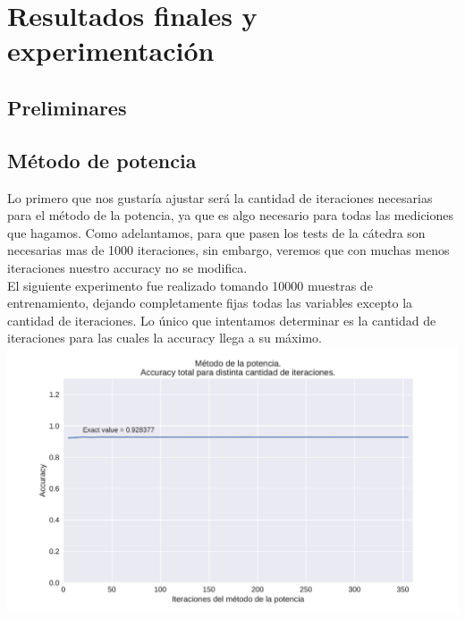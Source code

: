 \section{Resultados finales y experimentación}

\subsection{Preliminares}


\subsection{Método de potencia}

Lo primero que nos gustaría ajustar será la cantidad de iteraciones necesarias para el método de la potencia, ya que es algo necesario para todas las mediciones que hagamos. Como adelantamos, para que pasen los tests de la cátedra son necesarias mas de 1000 iteraciones, sin embargo, veremos que con muchas menos iteraciones nuestro accuracy no se modifica. \\

El siguiente experimento fue realizado tomando 10000 muestras de entrenamiento, dejando completamente fijas todas las variables excepto la cantidad de iteraciones. Lo único que intentamos determinar es la cantidad de iteraciones para las cuales la accuracy llega a su máximo. \\

{\centering
    \includegraphics[scale=0.60]{informe/imagenes/potencia/accuracyPorIters.pdf} \\
}
$ $\newline

